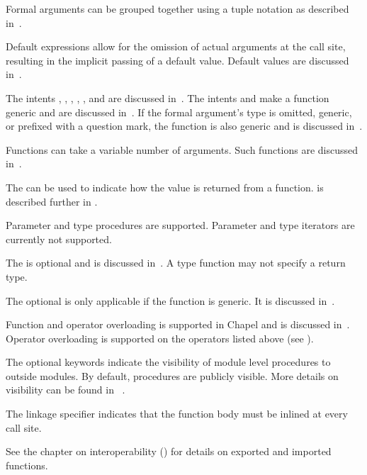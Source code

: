Formal arguments can be grouped together using a tuple notation as
described in~.

Default expressions allow for the omission of actual arguments at the
call site, resulting in the implicit passing of a default value.
Default values are discussed in~.

The intents , , , , ,  and  are discussed
in~.  The intents  and  make a
function generic and are discussed in~.  If
the formal argument's type is omitted, generic, or prefixed with a
question mark, the function is also generic and is discussed
in~.

Functions can take a variable number of arguments.  Such functions are
discussed in~.

The  can be used to indicate how the value is returned from
a function.   is described further in .

\begin{openissue}
Parameter and type procedures are supported. Parameter and type
iterators are currently not supported.
\end{openissue}

The  is optional and is discussed in~.
A type function may not specify a return type.

The optional  is only applicable if the function is
generic.  It is discussed in~.

Function and operator overloading is supported in Chapel and is
discussed in~.
Operator overloading is supported on the operators listed
above (see ).

The optional  keywords indicate the visibility
of module level procedures to outside modules.  By default, procedures are
publicly visible.  More details on visibility can be found in
~.

The linkage specifier  indicates that the function body must be inlined at
every call site.

See the chapter on interoperability ()
for details on exported and imported functions.

